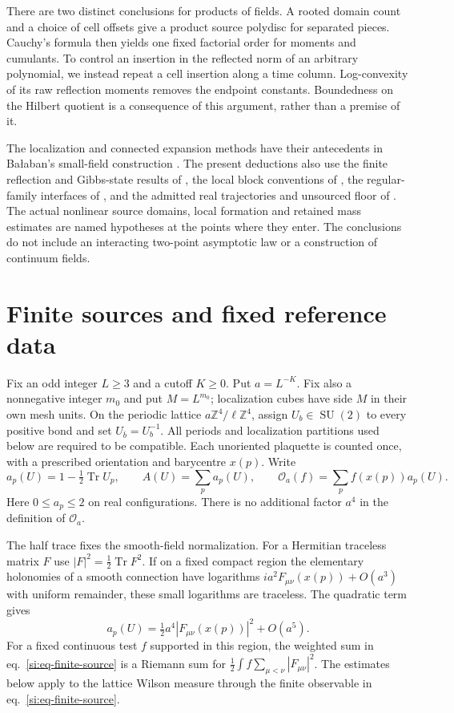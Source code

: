 \documentclass[11pt,letterpaper,reqno]{amsart}
\numberwithin{equation}{section}
\renewcommand{\eqref}[1]{\textup{eq.~\ref{#1}}}
\theoremstyle{definition}
\theoremstyle{remark}
\begin{document}
There are two distinct conclusions for products of fields. A rooted
domain count and a choice of cell offsets give a product source
polydisc for separated pieces. Cauchy's formula then yields one
fixed factorial order for moments and cumulants. To control an
insertion in the reflected norm of an arbitrary polynomial, we
instead repeat a cell insertion along a time column. Log-convexity
of its raw reflection moments removes the endpoint constants.
Boundedness on the Hilbert quotient is a consequence of this
argument, rather than a premise of it.

The localization and connected expansion methods have their
antecedents in Ba\l aban's small-field construction
\cite[\S\S1--2, pp.~2--22]{Bal88c}. The present deductions also use
the finite reflection and Gibbs-state results of \cite{LP}, the
local block conventions of \cite{BA}, the regular-family interfaces
of \cite{EM}, and the admitted real trajectories and unsourced floor
of \cite{RT}. The actual nonlinear source domains, local formation
and retained mass estimates are named hypotheses at the points
where they enter. The conclusions do not include an interacting
two-point asymptotic law or a construction of continuum fields.

\section{Finite sources and fixed reference data}
\label{si:sec-setting}

Fix an odd integer $L\ge3$ and a cutoff $K\ge0$. Put $a=L^{-K}$.
Fix also a nonnegative integer $m_0$ and put $M=L^{m_0}$;
localization cubes have side $M$ in their own mesh units.
On the periodic lattice $a\mathbb Z^4/\ell\mathbb Z^4$, assign
$U_b\in\operatorname{SU}(2)$ to every positive bond and set
$U_{\bar b}=U_b^{-1}$. All periods and localization partitions used
below are required to be compatible. Each unoriented plaquette is
counted once, with a prescribed orientation and barycentre $x(p)$.
Write
\begin{equation}\label{si:eq-finite-source}
 a_p(U)=1-\tfrac12\operatorname{Tr}U_p,\qquad
 A(U)=\sum_p a_p(U),\qquad
 \mathcal O_a(f)=\sum_p f(x(p))a_p(U).
\end{equation}
Here $0\le a_p\le2$ on real configurations. There is no additional
factor $a^4$ in the definition of $\mathcal O_a$.

The half trace fixes the smooth-field normalization. For a
Hermitian traceless matrix $F$ use $|F|^2=\tfrac12\operatorname{Tr}F^2$.
If on a fixed compact region the elementary holonomies of a
smooth connection have logarithms
$i a^2 F_{\mu\nu}(x(p))+O(a^3)$ with uniform remainder, these
small logarithms are traceless. The quadratic term gives
\[
 a_p(U)=\tfrac12 a^4 |F_{\mu\nu}(x(p))|^2+O(a^5).
\]
For a fixed continuous test $f$ supported in this region, the weighted sum in
\eqref{si:eq-finite-source} is a Riemann sum for
$\tfrac12\int f\sum_{\mu<\nu}|F_{\mu\nu}|^2$. The estimates below
apply to the lattice Wilson measure through the finite observable
in \eqref{si:eq-finite-source}.
\end{document}
